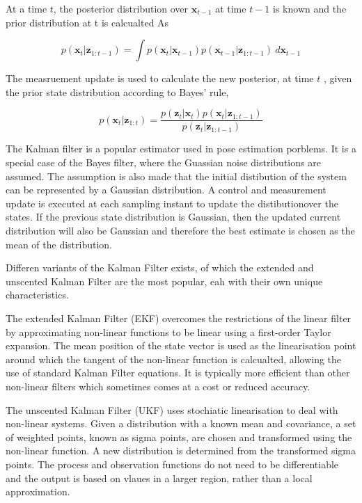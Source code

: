 At a time $t$, the posterior distribution over $\mathbf{x}_{t-1}$ at time $t-1$ is known and the prior distribution at t is calcualted As

\begin{equation}
    p(\mathbf{x}_t|\mathbf{z}_{1:t-1}) = \int p(\mathbf{x}_t|\mathbf{x}_{t-1})p(\mathbf{x}_{t-1}|\mathbf{z}_{1:t-1})\ d\mathbf{x}_{t-1}
\end{equation}

The measruement update is used to calculate the new posterior, at time $t$ , given the prior state distribution according to Bayes' rule,

\begin{equation}
    p(\mathbf{x}_t|\mathbf{z}_{1:t}) = 
    \frac{p(\mathbf{z}_t|\mathbf{x}_t)p(\mathbf{x}_t|\mathbf{z}_{1:t-1})}{p(\mathbf{z}_t|\mathbf{z}_{1:t-1})}
\end{equation}

The Kalman filter is a popular estimator used in pose estimation porblems. It is a special case of the Bayes filter, where the Guassian noise distributions are assumed.
The assumption is also made that the initial distibution of the system can be represented by a Gaussian distribution. A control and measurement update is executed
at each sampling instant to update the distibutionover the states. If the previous state distribution is Gaussian, then the updated current distribution will also be Gaussian
and therefore the best estimate is chosen as the mean of the distribution.

Differen variants of the Kalman Filter exists, of which the extended and unscented Kalman Filter are the most popular, eah with their own unique characteristics.

The extended Kalman Filter (EKF) overcomes the restrictions of the linear filter by approximating non-linear functions to be linear using a first-order Taylor expansion.
The mean position of the state vector is used as the linearisation point around which the tangent of the non-linear function is calcualted, allowing the use of standard
Kalman Filter equations. It is typically more efficient than other non-linear filters which sometimes comes at a cost or reduced accuracy.

The unscented Kalman Filter (UKF) uses stochiatic linearisation to deal with non-linear systems. Given a distribution with a known mean and covariance, a set of weighted points,
known as sigma points, are chosen and transformed using the non-linear function. A new distribution is determined from the transformed sigma points. The process and observation
functions do not need to be differentiable and the output is based on vlaues in a larger region, rather than a local approximation.

